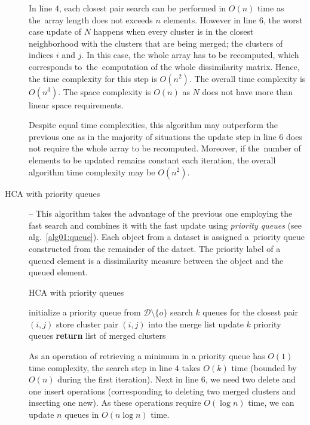 \begin{description}
	
	 In line $4$, each closest pair search can be performed in $O(n)$ time as the~array length does not exceeds $n$ elements. However in line $6$, the worst case update of $N$ happens when every cluster is in the closest neighborhood with the clusters that are being merged; the clusters of indices $i$ and $j$. In this case, the whole array has to be recomputed, which corresponds to~the~computation of the whole dissimilarity matrix. Hence, the time complexity for this step is $O(n^2)$. The overall time complexity is $O(n^3)$. The space complexity is $O(n)$ as $N$ does not have more than linear space requirements.
	 
	 \begin{rem}
	 	Despite equal time complexities, this algorithm may outperform the previous one as in the majority of situations the update step in line $6$ does not require the whole array to be recomputed. Moreover, if the~number of elements to be updated remains constant each iteration, the overall algorithm time complexity may be $O(n^2)$. 
	 \end{rem}
	 
	 \item[HCA with priority queues] -- This algorithm takes the advantage of the previous one employing the fast search and combines it with the fast update using \emph{priority queues} (see alg.~\ref{alg01:queue}).
	 Each object from a dataset is assigned a~priority queue constructed from the remainder of the datset. The priority label of a queued element is a dissimilarity measure between the object and the queued element. 
	 
	 \begin{algorithm}
	 	\caption{HCA with priority queues}
	 	\label{alg01:queue}
	 	\begin{algorithmic}[1]
	 		\State initialize a priority queue from $\mathcal{D} \setminus \{o\}$
	 		\EndFor
	 		\State search $k$ queues for the closest pair $(i,j)$ 
	 		\State store cluster pair $(i,j)$ into the merge list 
	 		\State update $k$ priority queues 
	 		\EndFor
	 		\State \textbf{return} list of merged clusters
	 		\EndProcedure
	 	\end{algorithmic}
	 \end{algorithm}
 
 	
 	As an operation of retrieving a minimum in a priority queue has $O(1)$ time complexity, the search step in line $4$ takes $O(k)$ time (bounded by $O(n)$ during the first iteration). Next in line $6$, we need two delete and one insert operations (corresponding to deleting two merged clusters and inserting one new). As these operations require $O(\log{n})$ time, we can update $n$ queues in $O(n\log{n})$ time.
 	

\end{description}
